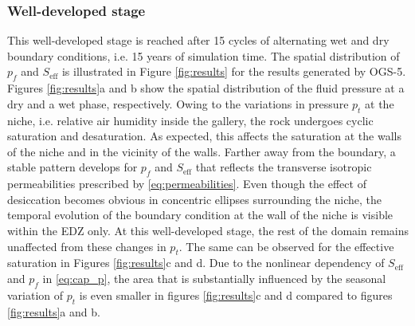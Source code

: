\subsubsection{Well-developed stage}\label{sec:well_developed}
This well-developed stage is reached after 15 cycles of alternating wet and dry boundary conditions, i.e. 15 years of simulation time. The spatial distribution of $p_f$ and $S_\text{eff}$ is illustrated in Figure \ref{fig:results} for the results generated by OGS-5. Figures \ref{fig:results}a and b show the spatial distribution of the fluid pressure at a dry and a wet phase, respectively. Owing to the variations in pressure $p_t$ at the niche, i.e. relative air humidity inside the gallery,  the rock undergoes cyclic saturation and desaturation. As expected, this affects the saturation at the walls of the niche and in the vicinity of the walls. Farther away  from the boundary, a stable pattern develops for $p_f$ and $S_\text{eff}$ that reflects the transverse isotropic permeabilities prescribed by \eqref{eq:permeabilities}.  Even though the effect of desiccation becomes obvious in concentric ellipses surrounding the niche, the temporal evolution of the boundary condition at the wall of the niche is visible within the EDZ only. At this well-developed stage, the rest of the domain remains unaffected from these changes in $p_t$. The same can be observed for the effective saturation in Figures \ref{fig:results}c and d. Due to the nonlinear dependency of $S_\text{eff}$ and $p_f$ in \eqref{eq:cap_p}, the area that is substantially influenced by the seasonal variation of $p_t$ is even smaller in figures \ref{fig:results}c and d compared to figures \ref{fig:results}a and b.
%
